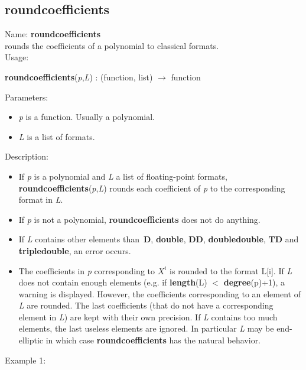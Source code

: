 \subsection{roundcoefficients}
\label{labroundcoefficients}
\noindent Name: \textbf{roundcoefficients}\\
rounds the coefficients of a polynomial to classical formats.\\

\noindent Usage: 
\begin{center}
\textbf{roundcoefficients}(\emph{p},\emph{L}) : (\textsf{function}, \textsf{list}) $\rightarrow$ \textsf{function}\\
\end{center}
Parameters: 
\begin{itemize}
\item \emph{p} is a function. Usually a polynomial.
\item \emph{L} is a list of formats.
\end{itemize}
\noindent Description: \begin{itemize}

\item If \emph{p} is a polynomial and \emph{L} a list of floating-point formats, 
   \textbf{roundcoefficients}(\emph{p},\emph{L}) rounds each coefficient of \emph{p} to the corresponding format
   in \emph{L}.

\item If \emph{p} is not a polynomial, \textbf{roundcoefficients} does not do anything.

\item If \emph{L} contains other elements than \textbf{D}, \textbf{double}, \textbf{DD}, \textbf{doubledouble}, \textbf{TD} and
   \textbf{tripledouble}, an error occurs.

\item The coefficients in \emph{p} corresponding to $X^i$ is rounded to the 
   format L[i]. If \emph{L} does not contain enough elements
   (e.g. if \textbf{length}(L) $<$ \textbf{degree}(p)+1), a warning is displayed. However, the
   coefficients corresponding to an element of \emph{L} are rounded. The last 
   coefficients (that do not have a corresponding element in \emph{L}) are kept with
   their own precision.
   If \emph{L} contains too much elements, the last useless elements are ignored.
   In particular \emph{L} may be end-elliptic in which case \textbf{roundcoefficients} has the 
   natural behavior.
\end{itemize}
\noindent Example 1: 
